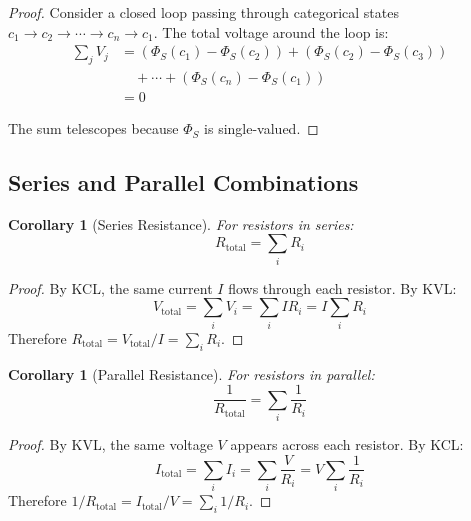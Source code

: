 \documentclass[twocolumn,showpacs,preprintnumbers,amsmath,amssymb,prd]{revtex4-2}
\newtheorem{corollary}[theorem]{Corollary}
\begin{document}
\begin{proof}
Consider a closed loop passing through categorical states $c_1 \to c_2 \to \cdots \to c_n \to c_1$. The total voltage around the loop is:
\begin{align}
\sum_j V_j &= (\Phi_S(c_1) - \Phi_S(c_2)) + (\Phi_S(c_2) - \Phi_S(c_3)) \nonumber\\
&\quad + \cdots + (\Phi_S(c_n) - \Phi_S(c_1)) \nonumber\\
&= 0
\label{eq:kvl_proof}
\end{align}

The sum telescopes because $\Phi_S$ is single-valued.
\end{proof}

\subsection{Series and Parallel Combinations}

\begin{corollary}[Series Resistance]
\label{cor:series}
For resistors in series:
\begin{equation}
R_{\text{total}} = \sum_i R_i
\label{eq:series}
\end{equation}
\end{corollary}

\begin{proof}
By KCL, the same current $I$ flows through each resistor. By KVL:
\begin{equation}
V_{\text{total}} = \sum_i V_i = \sum_i IR_i = I\sum_i R_i
\end{equation}
Therefore $R_{\text{total}} = V_{\text{total}}/I = \sum_i R_i$.
\end{proof}

\begin{corollary}[Parallel Resistance]
\label{cor:parallel}
For resistors in parallel:
\begin{equation}
\frac{1}{R_{\text{total}}} = \sum_i \frac{1}{R_i}
\label{eq:parallel}
\end{equation}
\end{corollary}

\begin{proof}
By KVL, the same voltage $V$ appears across each resistor. By KCL:
\begin{equation}
I_{\text{total}} = \sum_i I_i = \sum_i \frac{V}{R_i} = V\sum_i \frac{1}{R_i}
\end{equation}
Therefore $1/R_{\text{total}} = I_{\text{total}}/V = \sum_i 1/R_i$.
\end{proof}
\end{document}
